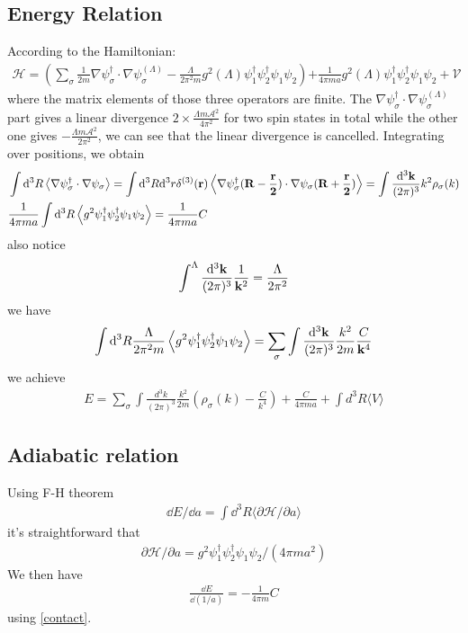 \documentclass{article}
\newcommand{\calA}{\mathcal{A}}
\newcommand{\mme}[1]{\frac{\dd^3\vb{#1}}{(2\pi)^3}}
\begin{document}
\subsection{Energy Relation}
According to the Hamiltonian:
\begin{align}
	\mathcal{H} = \left(\sum_{\sigma} \frac {1} {2 m} \nabla \psi_{\sigma}^{\dagger} \cdot \nabla \psi_{\sigma}^{(\Lambda)} - \frac {\Lambda} {2 \pi^{2} m} g^{2}(\Lambda) \psi_{1}^{\dagger} \psi_{2}^{\dagger} \psi_{1} \psi_{2}\right){+ \frac {1} {4 \pi m a} g^{2}(\Lambda) \psi_{1}^{\dagger} \psi_{2}^{\dagger} \psi_{1} \psi_{2} + \mathcal{V}}
\end{align}
where the matrix elements of those three operators are finite. The $\nabla \psi_{\sigma}^{\dagger} \cdot \nabla \psi_{\sigma}^{(\Lambda)}$ part gives a linear divergence $2\times\frac{\Lambda  m\calA^2}{4 \pi ^2}$ for two spin states in total while the other one gives $-\frac{\Lambda m\calA^2}{2\pi^2}$, we can see that the linear divergence is cancelled. Integrating over positions, we obtain
\begin{align}
	  & \int\dd^3R\expval{\nabla \psi_{\sigma}^{\dagger} \cdot \nabla \psi_{\sigma}}=\int\dd^3R\dd^3r\delta^{(3)}(\vb{r})\expval{\nabla \psi_{\sigma}^{\dagger}(\vb{R-\frac{r}{2}}) \cdot \nabla \psi_{\sigma}(\vb{R+\frac{r}{2}})} =\int\mme{k}k^2\rho_\sigma(k) \\
	  & \frac {1} {4 \pi m a} \int\dd^3R \expval{g^{2}\psi_{1}^{\dagger} \psi_{2}^{\dagger} \psi_{1} \psi_{2}}=\frac {1} {4 \pi m a}C
\end{align}
also notice
\begin{align}
	\int^\Lambda\mme{k}\frac{1}{\vb{k}^2}=\frac{\Lambda}{2\pi^2}
\end{align}
we have
\begin{align}
	\int\dd^3R\frac {\Lambda} {2 \pi^{2} m} \expval{g^{2} \psi_{1}^{\dagger} \psi_{2}^{\dagger} \psi_{1} \psi_{2}}=\sum_\sigma\int\mme{k}\frac{k^2}{2m}\frac{C}{\vb{k}^4}
\end{align}
we achieve
\begin{align}
	E = \sum_{\sigma} \int \frac {d^{3} k} {(2 \pi)^{3}} \frac {k^{2}} {2 m} \left(\rho_{\sigma} (k) - \frac {C} {k^{4}}\right) + \frac {C} {4 \pi m a}+ \int d^{3} R \langle V \rangle
\end{align}
\subsection{Adiabatic relation}
Using F-H theorem
\begin{align}
	\dd E / \dd a = \int \dd^{3} R \langle \partial \mathcal{H} / \partial a \rangle
\end{align}
it's straightforward that
\begin{align}
	\partial \mathcal{H} / \partial a = g^{2} \psi_{1}^{\dagger} \psi_{2}^{\dagger} \psi_{1} \psi_{2} / (4 \pi m a^{2})
\end{align}
We then have
\begin{align}
	\frac {\dd E} {\dd (1 / a)} = - \frac {1} {4 \pi m} C
\end{align}
using \eqref{contact}.
\end{document}
